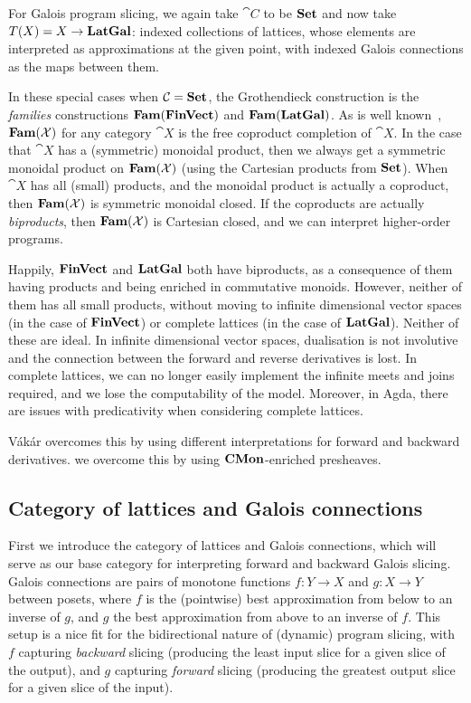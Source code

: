 For Galois program slicing, we again take $\cat{C}$ to be $\mathbf{Set}$ and now take $T(X) = X \to \mathbf{LatGal}$: indexed collections of lattices, whose elements are interpreted as approximations at the given point, with indexed Galois connections as the maps between them.

In these special cases when $\mathcal{C} = \mathbf{Set}$, the Grothendieck construction is the {\em families} constructions $\mathbf{Fam}(\mathbf{FinVect})$ and $\mathbf{Fam}(\mathbf{LatGal})$. As is well known~\cite{lawvere63}, $\mathbf{Fam}(\mathcal{X})$ for any category $\cat{X}$ is the free coproduct completion of $\cat{X}$. In the case that $\cat{X}$ has a (symmetric) monoidal product, then we always get a symmetric monoidal product on $\mathbf{Fam}(\mathcal{X})$ (using the Cartesian products from $\mathbf{Set}$). When $\cat{X}$ has all (small) products, and the monoidal product is actually a coproduct, then $\mathbf{Fam}(\mathcal{X})$ is symmetric monoidal closed. If the coproducts are actually {\em biproducts}, then $\mathbf{Fam}(\mathcal{X})$ is Cartesian closed, and we can interpret higher-order programs.


Happily, $\mathbf{FinVect}$ and $\mathbf{LatGal}$ both have biproducts, as a consequence of them having products and being enriched in commutative monoids. However, neither of them has all small products, without moving to infinite dimensional vector spaces (in the case of $\mathbf{FinVect}$) or complete lattices (in the case of $\mathbf{LatGal}$). Neither of these are ideal. In infinite dimensional vector spaces, dualisation is not involutive and the connection between the forward and reverse derivatives is lost. In complete lattices, we can no longer easily implement the infinite meets and joins required, and we lose the computability of the model. Moreover, in Agda, there are issues with predicativity when considering complete lattices.

Vákár overcomes this by using different interpretations for forward and backward derivatives. we overcome this by using $\mathbf{CMon}$-enriched presheaves.

\subsection{Category of lattices and Galois connections}

First we introduce the category of lattices and Galois connections, which will serve as our base category for
interpreting forward and backward Galois slicing. Galois connections are pairs of monotone functions $f: Y \to
X$ and $g: X \to Y$ between posets, where $f$ is the (pointwise) best approximation from below to an inverse
of $g$, and $g$ the best approximation from above to an inverse of $f$. This setup is a nice fit for the
bidirectional nature of (dynamic) program slicing, with $f$ capturing \emph{backward} slicing (producing the
least input slice for a given slice of the output), and $g$ capturing \emph{forward} slicing (producing the
greatest output slice for a given slice of the input).

